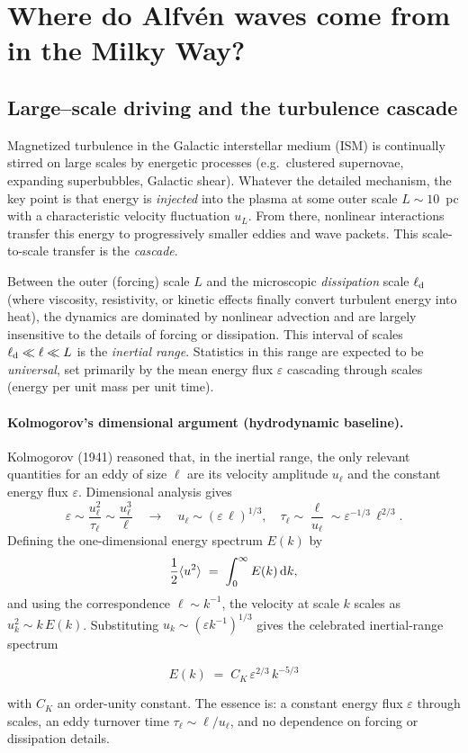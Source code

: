 \newpage

\section{Where do Alfv\'en waves come from in the Milky Way?}
\subsection{Large–scale driving and the turbulence cascade}

Magnetized turbulence in the Galactic interstellar medium (ISM) is continually stirred on large scales by energetic processes (e.g.\ clustered supernovae, expanding superbubbles, Galactic shear). Whatever the detailed mechanism, the key point is that energy is \emph{injected} into the plasma at some outer scale \(L \sim 10 \)~pc with a characteristic velocity fluctuation \(u_L\). From there, nonlinear interactions transfer this energy to progressively smaller eddies and wave packets. This scale-to-scale transfer is the \emph{cascade}. 

Between the outer (forcing) scale \(L\) and the microscopic \emph{dissipation} scale \(\ell_{\rm d}\) (where viscosity, resistivity, or kinetic effects finally convert turbulent energy into heat), the dynamics are dominated by nonlinear advection and are largely insensitive to the details of forcing or dissipation. This interval of scales \( \ell_{\rm d} \ll \ell \ll L \) is the \emph{inertial range}. Statistics in this range are expected to be \emph{universal}, set primarily by the mean energy flux \(\varepsilon\) cascading through scales (energy per unit mass per unit time).

\paragraph{Kolmogorov’s dimensional argument (hydrodynamic baseline).}
Kolmogorov (1941) reasoned that, in the inertial range, the only relevant quantities for an eddy of size \(\ell\) are its velocity amplitude \(u_\ell\) and the constant energy flux \(\varepsilon\). Dimensional analysis gives
\[
\varepsilon \sim \frac{u_\ell^2}{\tau_\ell}\sim \frac{u_\ell^3}{\ell}
\quad\rightarrow\quad
u_\ell \sim (\varepsilon\,\ell)^{1/3},\quad 
\tau_\ell \sim \frac{\ell}{u_\ell} \sim \varepsilon^{-1/3}\,\ell^{2/3}.
\]
Defining the one-dimensional energy spectrum \(E(k)\) by
\[
\frac{1}{2}\langle u^2\rangle \;=\; \int_0^\infty E(k)\,{\rm d}k,
\]
and using the correspondence \(\ell\sim k^{-1}\), the velocity at scale \(k\) scales as \(u_k^2\sim k\,E(k)\). 
%
Substituting \(u_k\sim (\varepsilon k^{-1})^{1/3}\) gives the celebrated inertial-range spectrum
\begin{remark}
\[
E(k)\;=\; C_K\,\varepsilon^{2/3}\,k^{-5/3}
\]
\end{remark}
with \(C_K\) an order-unity constant. The essence is: a constant energy flux \(\varepsilon\) through scales, an eddy turnover time \(\tau_\ell\sim\ell/u_\ell\), and no dependence on forcing or dissipation details.

